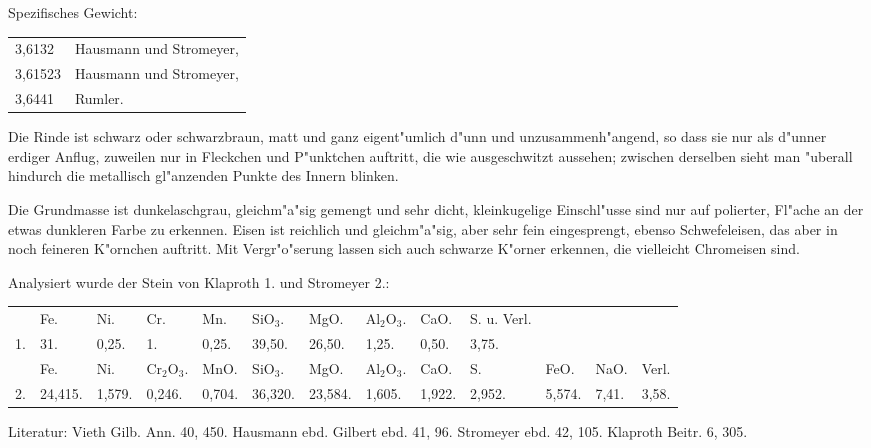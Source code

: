 \documentclass[a4paper, 11pt, oneside]{article}
\begin{document}
Spezifisches Gewicht:
\begin{table}[!ht]
    \centering\swabfamily\Large
    \begin{tabular}{l l}
        3,6132 & Hausmann und Stromeyer,\\
        3,61523 & Hausmann und Stromeyer,\\
        3,6441 & Rumler.
    \end{tabular}
\end{table}

Die Rinde ist schwarz oder schwarzbraun, matt und ganz eigent"umlich d"unn und unzusammenh"angend, so dass sie nur als d"unner erdiger Anflug, zuweilen nur in Fleckchen und P"unktchen auftritt, die wie ausgeschwitzt aussehen; zwischen derselben sieht man "uberall hindurch die metallisch gl"anzenden Punkte des Innern blinken.

Die Grundmasse ist dunkelaschgrau, gleichm"a"sig gemengt und sehr dicht, kleinkugelige Einschl"usse sind nur auf polierter, Fl"ache an der etwas dunkleren Farbe zu erkennen. Eisen ist reichlich und gleichm"a"sig, aber sehr fein eingesprengt, ebenso Schwefeleisen, das aber in noch feineren K"ornchen auftritt. Mit Vergr"o"serung lassen sich auch schwarze K"orner erkennen, die vielleicht Chromeisen sind.

Analysiert wurde der Stein von Klaproth 1. und Stromeyer 2.:
\begin{table}[!ht]
    \centering\swabfamily\Large
    \normalsize
    \begin{tabular}{p{3mm} p{6mm} p{5mm} p{6mm} p{5mm} p{6mm} p{7mm} p{5mm} p{5mm} p{13mm} p{4mm} p{4mm} p{4mm}}
         & Fe. & Ni. & Cr. & Mn. & SiO$_{3}$. & MgO. & Al$_{2}$O$_{3}$. & CaO. & S. u. Verl. &  &  &  \\ 
        1. & 31. & 0,25. & 1. & 0,25. & 39,50. & 26,50. & 1,25. & 0,50. & 3,75. &  &  &  \\ \hline
         & Fe. & Ni. & Cr$_{2}$O$_{3}$. & MnO. & SiO$_{3}$. & MgO. & Al$_{2}$O$_{3}$. & CaO. & S. & FeO. & NaO. & Verl. \\
        2. & 24,415. & 1,579. & 0,246. & 0,704. & 36,320. & 23,584. & 1,605. & 1,922. & 2,952. & 5,574. & 7,41. & 3,58. \\
    \end{tabular}
\end{table}

\normalsize
Literatur: Vieth Gilb. Ann. 40, 450. Hausmann ebd. Gilbert ebd. 41, 96. Stromeyer ebd. 42, 105. Klaproth Beitr. 6, 305.
\subsection{}
\LARGE
\end{document}
